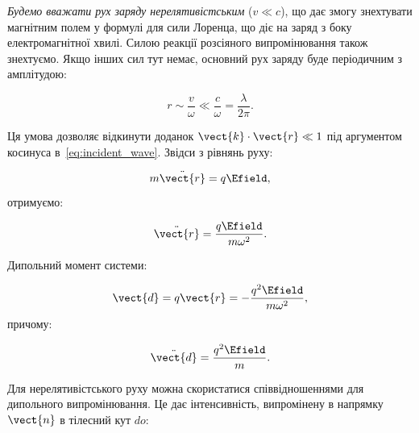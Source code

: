 \textit{Будемо вважати рух заряду нерелятивістським} (\( v \ll c \)), що дає змогу знехтувати магнітним полем у формулі
для сили Лоренца, що діє на заряд з боку електромагнітної хвилі. Силою реакції розсіяного випромінювання також
знехтуємо.
%
Якщо інших сил тут немає, основний рух заряду буде періодичним з амплітудою:

\begin{equation*}
r \sim \frac{v}{\omega} \ll \frac{c}{\omega} = \frac{\lambda}{2\pi}.
\end{equation*}

Ця умова дозволяє відкинути доданок \( \vect{k} \cdot \vect{r} \ll 1 \) під аргументом косинуса
в~\eqref{eq:incident_wave}. Звідси з рівнянь руху:

\begin{equation*}
m \ddot{\vect{r}} = q \Efield,
\end{equation*}
%
отримуємо:

\begin{equation*}
\ddot{\vect{r}} = \frac{q \Efield}{m \omega^2}.
\end{equation*}

Дипольний момент системи:

\begin{equation*}
\vect{d} = q \vect{r} = -\frac{q^2 \Efield}{m \omega^2},
\end{equation*}
%
причому:

\begin{equation}
\ddot{\vect{d}} = \frac{q^2 \Efield}{m}.
\label{eq:dipole_moment}
\end{equation}

Для нерелятивістського руху можна скористатися співвідношеннями для дипольного випромінювання. Це дає інтенсивність,
випромінену в напрямку \( \vect{n} \) в тілесний кут \( do \):

